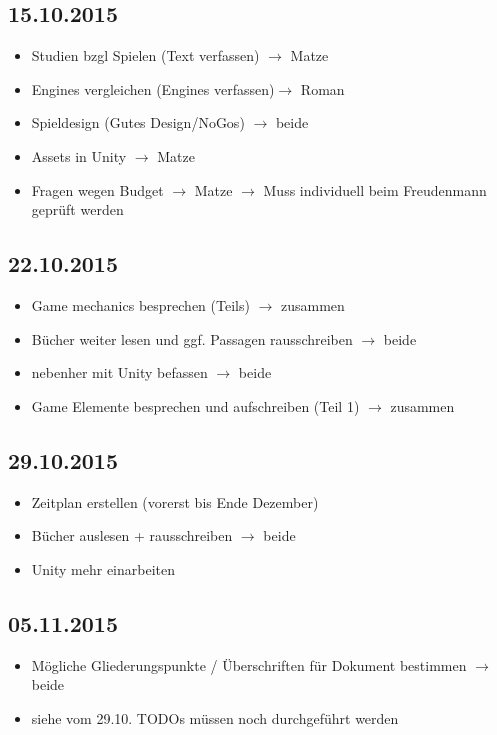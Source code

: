 \subsection{15.10.2015}
\begin{itemize}
\item \circledmark\quad  Studien bzgl Spielen (Text verfassen) $\rightarrow$ Matze
\item \circledmark\quad  Engines vergleichen (Engines verfassen)$\rightarrow$ Roman
\item \circledmark\quad  Spieldesign (Gutes Design/NoGos) $\rightarrow$ beide
\item \circledmark\quad  Assets in Unity $\rightarrow$ Matze
\item \circledmark\quad Fragen wegen Budget $\rightarrow$ Matze $\rightarrow$ Muss individuell beim Freudenmann geprüft werden
\end{itemize}

\subsection{22.10.2015}
\begin{itemize}
\item \circledmark\quad Game mechanics besprechen (Teils) $\rightarrow$ zusammen
\item \circledmark\quad Bücher weiter lesen und ggf. Passagen rausschreiben $\rightarrow$ beide
\item \circledmark\quad nebenher mit Unity befassen $\rightarrow$ beide
\item \circledmark\quad Game Elemente besprechen und aufschreiben (Teil 1) $\rightarrow$ zusammen
\end{itemize}

\subsection{29.10.2015}
\begin{itemize}
\item \circledmark\quad  Zeitplan erstellen (vorerst bis Ende Dezember)
\item \circledmark\quad  Bücher auslesen + rausschreiben $\rightarrow$ beide
\item \circledmark\quad Unity mehr einarbeiten
\end{itemize}

\subsection{05.11.2015}
\begin{itemize}
\item \circledmark\quad Mögliche Gliederungspunkte / Überschriften für Dokument bestimmen $\rightarrow$ beide
\item \circledmark\quad siehe vom 29.10. TODOs müssen noch durchgeführt werden
\end{itemize}

